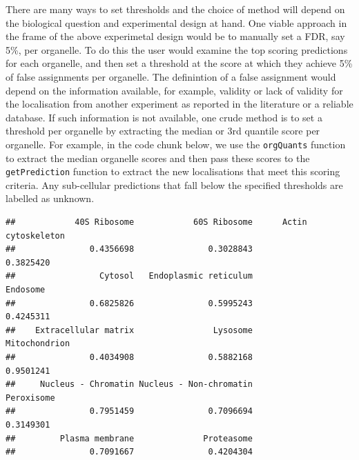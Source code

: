 There are many ways to set thresholds and the choice of method will
depend on the biological question and experimental design at hand. One
viable approach in the frame of the above experimetal design would be to
manually set a FDR, say 5\%, per organelle. To do this the user would
examine the top scoring predictions for each organelle, and then set a
threshold at the score at which they achieve 5\% of false assignments
per organelle. The definintion of a false assignment would depend on the
information available, for example, validity or lack of validity for the
localisation from another experiment as reported in the literature or a
reliable database. If such information is not available, one crude
method is to set a threshold per organelle by extracting the median or
3rd quantile score per organelle. For example, in the code chunk below,
we use the \texttt{orgQuants} function to extract the median organelle
scores and then pass these scores to the \texttt{getPrediction} function
to extract the new localisations that meet this scoring criteria. Any
sub-cellular predictions that fall below the specified thresholds are
labelled as unknown.

\begin{Shaded}
\begin{Highlighting}[]
\StringTok{ }
                 \NormalTok{, }
                 \NormalTok{,}
                 \NormalTok{, }
                 \NormalTok{)}
\end{Highlighting}
\end{Shaded}

\begin{verbatim}
##            40S Ribosome            60S Ribosome      Actin cytoskeleton 
##               0.4356698               0.3028843               0.3825420 
##                 Cytosol   Endoplasmic reticulum                Endosome 
##               0.6825826               0.5995243               0.4245311 
##    Extracellular matrix                Lysosome           Mitochondrion 
##               0.4034908               0.5882168               0.9501241 
##     Nucleus - Chromatin Nucleus - Non-chromatin              Peroxisome 
##               0.7951459               0.7096694               0.3149301 
##         Plasma membrane              Proteasome 
##               0.7091667               0.4204304
\end{verbatim}

